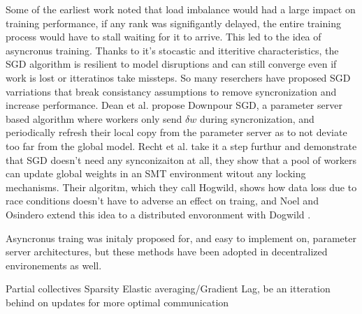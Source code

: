 Some of the earliest work noted that load imbalance would had a large impact on training performance, if any rank was signifigantly delayed, the entire training process would have to stall waiting for it to arrive.
This led to the idea of asyncronus training.
Thanks to it's stocastic and itteritive characteristics, the SGD algorithm is resilient to model disruptions and can still converge even if work is lost or itteratinos take missteps.
So many reserchers have proposed SGD varriations that break consistancy assumptions to remove syncronization and increase performance.
Dean et al. \cite{Dean2012DistBelif} propose Downpour SGD, a parameter server based algorithm where workers only send $\delta w$ during syncronization, and periodically refresh their local copy from the parameter server as to not deviate too far from the global model. 
Recht et al. \cite{Recht2011HogWild} take it a step furthur and demonstrate that SGD doesn't need any synconizaiton at all, they show that a pool of workers can update global weights in an SMT environment witout any locking mechanisms.
Their algoritm, which they call Hogwild, shows how data loss due to race conditions doesn't have to adverse an effect on traing, and Noel and Osindero extend this idea to a distributed envoronment with Dogwild \cite{Noel2014Dogwild}.

Asyncronus traing was initaly proposed for, and easy to implement on, parameter server architectures, but these methods have been adopted in decentralized environements as well.

Partial collectives \cite{Li2020DLPartialColl}
Sparsity \cite{Renggli2019SparCML, Dryden2016CommQuantDPDNN}
Elastic averaging/Gradient Lag, be an itteration behind on updates for more optimal communication   \cite{Kurth2018ExascaleDLClimate}

\cite{Kurth2019TFatScaleAnalysisOfHvdAndCPEML}

\cite{Ham2019DLENSOForcasts}

\cite{Awan2017InDepthPerfCharOfDNN}

